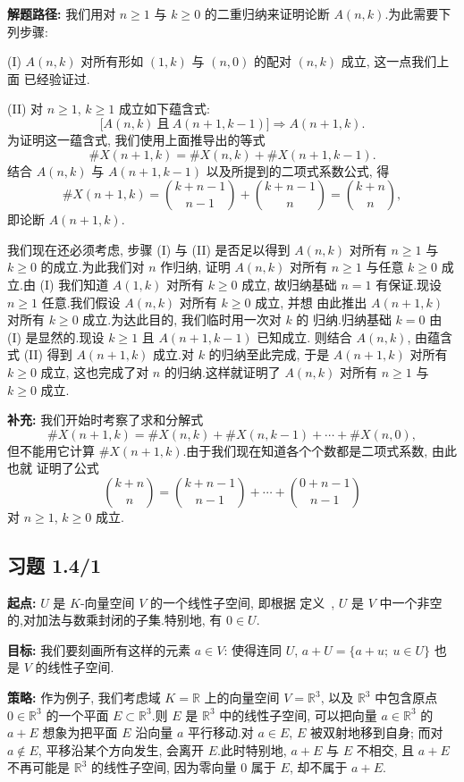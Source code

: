 \noindent\textbf{解题路径:} 我们用对 $n \geq 1$ 与 $k \geq 0$ 的二重归纳来证明论断
$A(n, k)$.为此需要下列步骤:

(I) $A(n, k)$ 对所有形如 $(1, k)$ 与 $(n, 0)$ 的配对 $(n, k)$ 成立, 这一点我们上面
已经验证过.

(II) 对 $n \geq 1$, $k \geq 1$ 成立如下蕴含式:
\[
\bigl[ A(n, k) \ \text{且}\ A(n+1, k-1) \bigr] \Longrightarrow A(n+1, k)\text{.}
\]
为证明这一蕴含式, 我们使用上面推导出的等式
\[
\#X(n+1, k) = \#X(n, k) + \#X(n+1, k-1)\text{.}
\]
结合 $A(n, k)$ 与 $A(n+1, k-1)$ 以及所提到的二项式系数公式, 得
\[
\#X(n+1, k) = \binom{k + n - 1}{n - 1} + \binom{k + n - 1}{n} = \binom{k + n}{n},
\]
即论断 $A(n+1, k)$.

我们现在还必须考虑, 步骤 (I) 与 (II) 是否足以得到 $A(n, k)$ 对所有 $n \geq 1$ 与
$k \geq 0$ 的成立.为此我们对 $n$ 作归纳, 证明 $A(n, k)$ 对所有 $n \geq 1$ 与任意
$k \geq 0$ 成立.由 (I) 我们知道 $A(1, k)$ 对所有 $k \geq 0$ 成立, 故归纳基础
$n = 1$ 有保证.现设 $n \geq 1$ 任意.我们假设 $A(n, k)$ 对所有 $k \geq 0$ 成立, 并想
由此推出 $A(n+1, k)$ 对所有 $k \geq 0$ 成立.为达此目的, 我们临时用一次对 $k$ 的
归纳.归纳基础 $k = 0$ 由 (I) 是显然的.现设 $k \geq 1$ 且 $A(n+1, k-1)$ 已知成立.
则结合 $A(n, k)$, 由蕴含式 (II) 得到 $A(n+1, k)$ 成立.对 $k$ 的归纳至此完成, 于是
$A(n+1, k)$ 对所有 $k \geq 0$ 成立, 这也完成了对 $n$ 的归纳.这样就证明了 $A(n, k)$
对所有 $n \geq 1$ 与 $k \geq 0$ 成立.

\noindent\textbf{补充:} 我们开始时考察了求和分解式
\[
\#X(n+1, k) = \#X(n, k) + \#X(n, k-1) + \cdots + \#X(n, 0),
\]
但不能用它计算 $\#X(n+1, k)$.由于我们现在知道各个个数都是二项式系数, 由此也就
证明了公式
\[
\binom{k + n}{n} = \binom{k + n - 1}{n - 1} + \cdots + \binom{0 + n - 1}{n - 1}
\]
对 $n \geq 1$, $k \geq 0$ 成立.

\subsection*{习题 1.4/1}

\noindent\textbf{起点:} $U$ 是 $K$-向量空间 $V$ 的一个线性子空间, 即根据
定义~, $U$ 是 $V$ 中一个非空的,对加法与数乘封闭的子集.特别地,
有 $0 \in U$.

\noindent\textbf{目标:} 我们要刻画所有这样的元素 $a \in V$: 使得连同 $U$,
$a + U = \{ a + u ;\ u \in U \}$ 也是 $V$ 的线性子空间.

\noindent\textbf{策略:} 作为例子, 我们考虑域 $K = \mathbb{R}$ 上的向量空间
$V = \mathbb{R}^3$, 以及 $\mathbb{R}^3$ 中包含原点 $0 \in \mathbb{R}^3$ 的一个平面
$E \subset \mathbb{R}^3$.则 $E$ 是 $\mathbb{R}^3$ 中的线性子空间, 可以把向量
$a \in \mathbb{R}^3$ 的 $a + E$ 想象为把平面 $E$ 沿向量 $a$ 平行移动.对 $a \in E$,
$E$ 被双射地移到自身; 而对 $a \notin E$, 平移沿某个方向发生, 会离开 $E$.此时特别地,
$a + E$ 与 $E$ 不相交, 且 $a + E$ 不再可能是 $\mathbb{R}^3$ 的线性子空间, 因为零向量
$0$ 属于 $E$, 却不属于 $a + E$.

